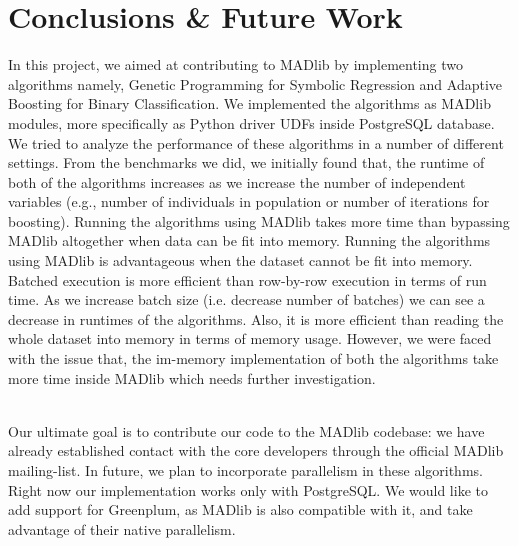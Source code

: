 
\section{Conclusions \& Future Work}
\label{sec:con}
In this project, we aimed at contributing to MADlib by implementing two algorithms namely, Genetic Programming for Symbolic Regression and Adaptive Boosting for Binary Classification. We implemented the algorithms as MADlib modules, more specifically as Python driver UDFs inside PostgreSQL database. We tried to analyze the performance of these algorithms in a number of different settings. From the benchmarks we did, we initially found that, the runtime of both of the algorithms increases as we increase the number of independent variables (e.g., number of individuals in population or number of iterations for boosting). Running the algorithms using MADlib takes more time than bypassing MADlib altogether when data can be fit into memory. Running the algorithms using MADlib is advantageous when the dataset cannot be fit into memory. Batched execution is more efficient than row-by-row execution in terms of run time. As we increase batch size (i.e. decrease number of batches) we can see a decrease in runtimes of the algorithms. Also, it is more efficient than reading the whole dataset into memory in terms of memory usage. However, we were faced with the issue that, the im-memory implementation of both the algorithms take more time inside MADlib which needs further investigation. 

~~\\
Our ultimate goal is to contribute our code to the MADlib codebase: we have already established contact with the core developers through the official MADlib mailing-list. In future, we plan to incorporate parallelism in these algorithms. Right now our implementation works only with PostgreSQL. We would like to add support for Greenplum, as MADlib is also compatible with it, and take advantage of their native parallelism. 
